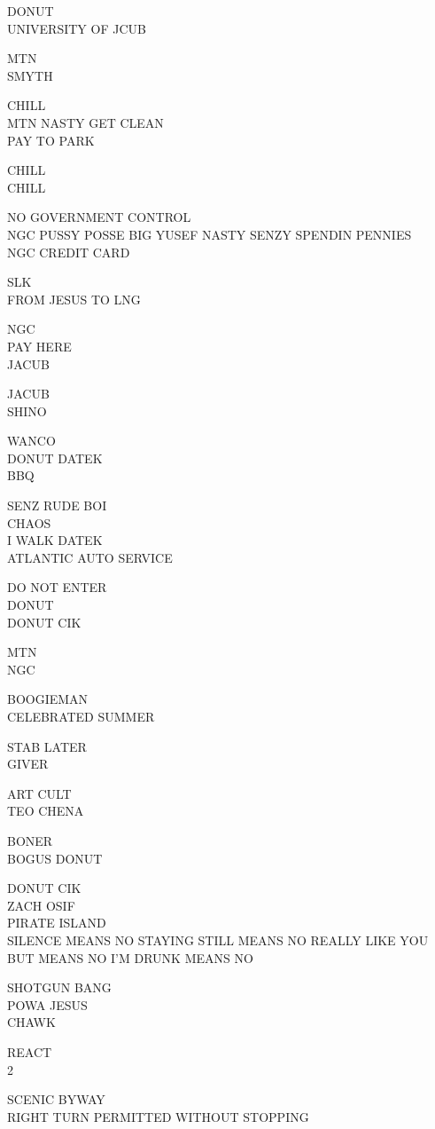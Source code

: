 \documentclass[10pt,letterpaper]{article}
\begin{document}
DONUT\\
UNIVERSITY OF JCUB

MTN\\
SMYTH

CHILL\\
MTN NASTY GET CLEAN\\
PAY TO PARK

CHILL\\
CHILL

NO GOVERNMENT CONTROL\\
NGC PUSSY POSSE BIG YUSEF NASTY SENZY SPENDIN PENNIES\\
NGC CREDIT CARD

SLK\\
FROM JESUS TO LNG

NGC\\
PAY HERE\\
JACUB

JACUB\\
SHINO

WANCO\\
DONUT DATEK\\
BBQ

SENZ RUDE BOI\\
CHAOS\\
I WALK  DATEK\\
ATLANTIC AUTO SERVICE

DO NOT ENTER\\
DONUT\\
DONUT CIK

MTN\\
NGC

BOOGIEMAN\\
CELEBRATED SUMMER

STAB LATER\\
GIVER

ART CULT\\
TEO CHENA

BONER\\
BOGUS DONUT

DONUT CIK\\
ZACH OSIF\\
PIRATE ISLAND\\
SILENCE MEANS NO STAYING STILL MEANS NO REALLY LIKE YOU BUT MEANS NO I'M DRUNK MEANS NO

SHOTGUN BANG\\
POWA JESUS\\
CHAWK

REACT\\
2

SCENIC BYWAY\\
RIGHT TURN PERMITTED WITHOUT STOPPING
\end{document}
